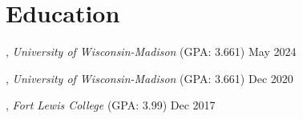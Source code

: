 \section{Education}

, \textit{University of Wisconsin-Madison} (GPA: 3.661) \hfill May 2024

, \textit{University of Wisconsin-Madison} (GPA: 3.661) \hfill Dec 2020

, \textit{Fort Lewis College} (GPA: 3.99) \hfill	Dec 2017